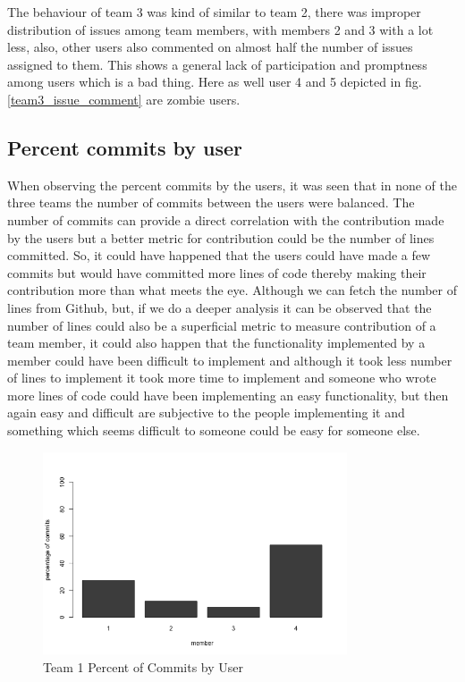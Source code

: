 \documentclass[conference]{IEEEtran}
\begin{document}
The behaviour of team 3 was kind of similar to team 2, there was improper distribution of issues among team members, with members 2 and 3 with a lot less, also, other users also commented on almost half the number of issues assigned to them. This shows a general lack of participation and promptness among users which is a bad thing. Here as well user 4 and 5 depicted in fig. \ref{team3_issue_comment} are zombie users.

\subsection{Percent commits by user}
When observing the percent commits by the users, it was seen that in none of the three teams the number of commits between the users were balanced. The number of commits can provide a direct correlation with the contribution made by the users but a better metric for contribution could be the number of lines committed. So, it could have happened that the users could have made a few commits but would have committed more lines of code thereby making their contribution more than what meets the eye. Although we can fetch the number of lines from Github, but, if we do a deeper analysis it can be observed that the number of lines could also be a superficial metric to measure contribution of a team member, it could also happen that the functionality implemented by a member could have been difficult to implement and although it took less number of lines to implement it took more time to implement and someone who wrote more lines of code could have been implementing an easy functionality, but then again easy and difficult are subjective to the people implementing it and something which seems difficult to someone could be easy for someone else. 

\begin{figure}[H]
    \centering
    \includegraphics[width=9cm]{../AprilProject/pic/users_commit_percentage_team1.png}
    \caption{Team 1 Percent of Commits by User}
    \label{team1_percent_commit}
\end{figure}
\end{document}
